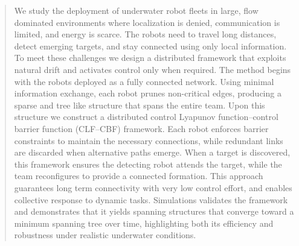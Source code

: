 \documentclass[conference]{IEEEconf}
\theoremstyle{plain}
\begin{document}
\begin{abstract}
We study the deployment of underwater robot fleets in large, flow dominated environments where localization is denied, communication is limited, and energy is scarce. The robots need to travel long distances, detect emerging targets, and stay connected using only local information. To meet these challenges we design a distributed framework that exploits natural drift and activates control only when required. The method begins with the robots deployed as a fully connected network. Using minimal information exchange, each robot prunes non-critical edges, producing a sparse and tree like structure that spans the entire team. Upon this structure we construct a distributed control Lyapunov function–control barrier function (CLF–CBF) framework. Each robot enforces barrier constraints to maintain the necessary connections, while redundant links are discarded when alternative paths emerge. When a target is discovered, this framework ensures the detecting robot attends the target, while the team reconfigures to provide a connected formation. This approach guarantees long term connectivity with very low control effort, and enables collective response to dynamic tasks. Simulations validates the framework and demonstrates that it yields spanning structures that converge toward a minimum spanning tree over time, highlighting both its efficiency and robustness under realistic underwater conditions.
\end{abstract}
\end{document}
